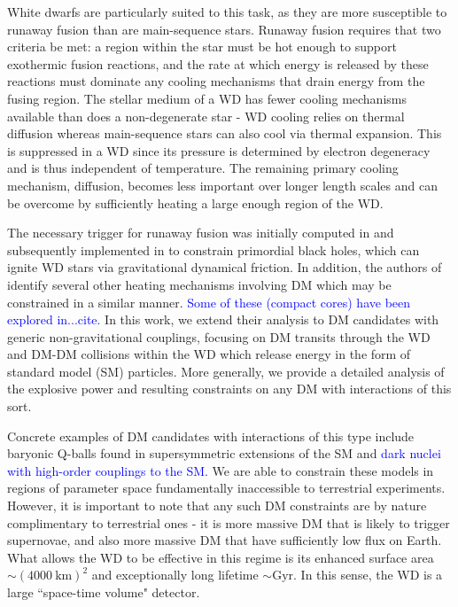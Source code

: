 \documentclass[twocolumn,showpacs,preprintnumbers,amsmath,amssymb,prd]{revtex4}
\begin{document}
White dwarfs are particularly suited to this task, as they are more susceptible to runaway fusion than are main-sequence stars. Runaway fusion requires that two criteria be met: a region within the star must be hot enough to support exothermic fusion reactions, and the rate at which energy is released by these reactions must dominate any cooling mechanisms that drain energy from the fusing region.  The stellar medium of a WD has fewer cooling mechanisms available than does a non-degenerate star - WD cooling relies on thermal diffusion whereas main-sequence stars can also cool via thermal expansion.  This is suppressed in a WD since its pressure is determined by electron degeneracy and is thus independent of temperature. The remaining primary cooling mechanism, diffusion, becomes less important over longer length scales and can be overcome by sufficiently heating a large enough region of the WD.

The necessary trigger for runaway fusion was initially computed in \cite{Woosley} and subsequently implemented in \cite{Graham:2015apa} to constrain primordial black holes, which can ignite WD stars via gravitational dynamical friction.  In addition, the authors of \cite{Graham:2015apa} identify several other heating mechanisms involving DM which may be constrained in a similar manner. \textcolor{blue}{Some of these (compact cores) have been explored in...cite.}  In this work, we extend their analysis to DM candidates with generic non-gravitational couplings, focusing on DM transits through the WD and DM-DM collisions within the WD which release energy in the form of standard model (SM) particles. More generally, we provide a detailed analysis of the explosive power and resulting constraints on any DM with interactions of this sort.

Concrete examples of DM candidates with interactions of this type include baryonic Q-balls found in supersymmetric extensions of the SM and \textcolor{blue}{dark nuclei with high-order couplings to the SM.} We are able to constrain these models in regions of parameter space fundamentally inaccessible to terrestrial experiments. However, it is important to note that any such DM constraints are by nature complimentary to terrestrial ones - it is more massive DM that is likely to trigger supernovae, and also more massive DM that have sufficiently low flux on Earth. What allows the WD to be effective in this regime is its enhanced surface area $\sim (4000 ~\text{km})^2$ and exceptionally long lifetime $\sim \text{Gyr}$. In this sense, the WD is a large ``space-time volume" detector.
\end{document}
